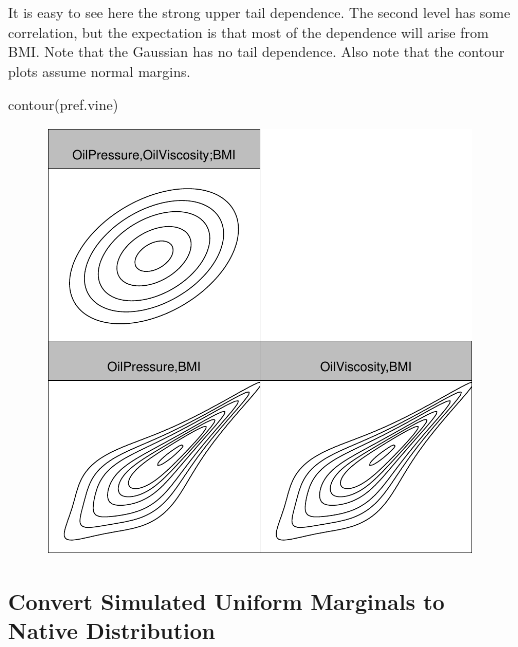 \documentclass[
  letterpaper,
  DIV=11,
  numbers=noendperiod]{scrartcl}
\newenvironment{Shaded}{\begin{snugshade}}{\end{snugshade}}
\newcommand{\FunctionTok}[1]{\textcolor[rgb]{0.28,0.35,0.67}{#1}}
\newcommand{\NormalTok}[1]{\textcolor[rgb]{0.00,0.23,0.31}{#1}}
\begin{document}
It is easy to see here the strong upper tail dependence. The second
level has some correlation, but the expectation is that most of the
dependence will arise from BMI. Note that the Gaussian has no tail
dependence. Also note that the contour plots assume normal margins.

\begin{Shaded}
\begin{Highlighting}[]
\FunctionTok{contour}\NormalTok{(pref.vine)}
\end{Highlighting}
\end{Shaded}

\begin{figure}[H]

{\centering \includegraphics{MakingData_files/figure-pdf/unnamed-chunk-6-1.pdf}

}

\end{figure}

\hypertarget{convert-simulated-uniform-marginals-to-native-distribution}{%
\subsection{Convert Simulated Uniform Marginals to Native
Distribution}\label{convert-simulated-uniform-marginals-to-native-distribution}}
\end{document}
